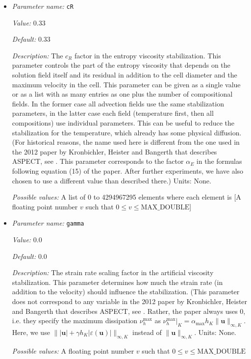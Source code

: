 \begin{itemize}
{\it Possible values:} A list of 0 to 4294967295 elements where each element is [A floating point number $v$ such that $0 \leq v \leq \text{MAX\_DOUBLE}$]
\item {\it Parameter name:} {\tt cR}
\label{parameters:Discretization/Stabilization parameters/cR}


{\it Value:} 0.33


{\it Default:} 0.33


{\it Description:} The $c_R$ factor in the entropy viscosity stabilization. This parameter controls the part of the entropy viscosity that depends on the solution field itself and its residual in addition to the cell diameter and the maximum velocity in the cell. This parameter can be given as a single value or as a list with as many entries as one plus the number of compositional fields. In the former case all advection fields use the same stabilization parameters, in the latter case each field (temperature first, then all compositions) use individual parameters. This can be useful to reduce the stabilization for the temperature, which already has some physical diffusion. (For historical reasons, the name used here is different from the one used in the 2012 paper by Kronbichler, Heister and Bangerth that describes ASPECT, see \cite{KHB12}. This parameter corresponds to the factor $\alpha_E$ in the formulas following equation (15) of the paper. After further experiments, we have also chosen to use a different value than described there.) Units: None.


{\it Possible values:} A list of 0 to 4294967295 elements where each element is [A floating point number $v$ such that $0 \leq v \leq \text{MAX\_DOUBLE}$]
\item {\it Parameter name:} {\tt gamma}
\label{parameters:Discretization/Stabilization parameters/gamma}


{\it Value:} 0.0


{\it Default:} 0.0


{\it Description:} The strain rate scaling factor in the artificial viscosity stabilization. This parameter determines how much the strain rate (in addition to the velocity) should influence the stabilization. (This parameter does not correspond to any variable in the 2012 paper by Kronbichler, Heister and Bangerth that describes ASPECT, see \cite{KHB12}. Rather, the paper always uses 0, i.e. they specify the maximum dissipation $\nu_h^\text{max}$ as $\nu_h^\text{max}\vert_K = \alpha_{\text{max}} h_K \|\mathbf u\|_{\infty,K}$. Here, we use $\|\lvert\mathbf u\rvert + \gamma h_K \lvert\varepsilon (\mathbf u)\rvert\|_{\infty,K}$ instead of $\|\mathbf u\|_{\infty,K}$. Units: None.


{\it Possible values:} A floating point number $v$ such that $0 \leq v \leq \text{MAX\_DOUBLE}$
\end{itemize}

